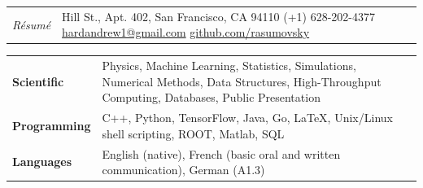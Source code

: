 \documentclass{letter}
\begin{document}

\begin{tabular}{p{}p{}}
  \hfill \newline \href{https://ch.linkedin.com/in/andrew-hard-25b690a5}{\Huge{\color{Maroon}{Andrew Hard}}} \newline \LARGE{\textit{R\'{e}sum\'{e}}} \newline
  &
  \hfill \newline 1 Hill St., Apt. 402, San Francisco, CA 94110 \newline
  (+1) 628-202-4377 \newline
  \href{mailto:hardandrew1@gmail.com}{hardandrew1@gmail.com} \newline
  \href{https://github.com/rasumovsky}{github.com/rasumovsky}\\
\end{tabular}



\begin{flushleft}
  \Large{\textsc{\textbf{\color{Maroon}{Skills}}}}
  \vspace{1pt}  %
\end{flushleft}

\begin{tabular}{p{}p{}}

  {\bf Scientific} 
  &
  Physics, Machine Learning, Statistics, Simulations, Numerical Methods, Data Structures, High-Throughput Computing, Databases, Public Presentation \newline
  \\

  {\bf Programming} 
  &
  C++, Python, TensorFlow, Java, Go, \LaTeX{}, Unix/Linux shell scripting, ROOT, Matlab, SQL \newline
  \\ 

  {\bf Languages}
  &
  English (native), French (basic oral and written communication), German (A1.3)
\end{tabular}



\begin{flushleft}
  \Large{\textsc{\textbf{\color{Maroon}{Experience}}}}
  \vspace{1pt} %
\end{flushleft}
\end{document}
